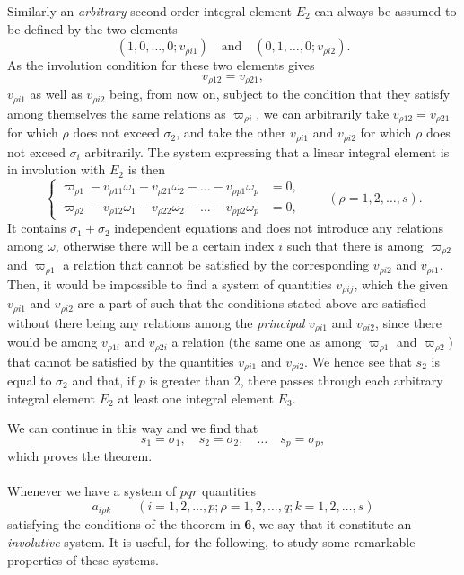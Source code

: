 \documentclass[leqno,11pt]{book}
\theoremstyle{shape1}
\theoremstyle{shapesmall}
\newcommand{\vp}{\varpi}
\begin{document}
Similarly an \emph{arbitrary} second order integral element $E_{2}$ can always be assumed to be defined by the two elements
\[
(1,0,\dots,0;v_{\rho i1})\quad\text{and}\quad(0,1,\dots,0;v_{\rho i2}).
\]
As the involution condition for these two elements gives
\[
v_{\rho 12}=v_{\rho 21},
\]
$v_{\rho i1}$ as well as $v_{\rho i2}$ being, from now on, subject to the condition that they satisfy among themselves the same relations as $\vp_{\rho i}$, we can arbitrarily take $v_{\rho 12}=v_{\rho 21}$ for which $\rho$ does not exceed $\sigma_{2}$, and take the other $v_{\rho i1}$ and $v_{\rho i2}$ for which $\rho$ does not exceed $\sigma_{i}$ arbitrarily. The system expressing that a linear integral element is in involution with $E_{2}$ is then
\begin{equation}
  \label{eq:p21}
  \left\{
    \begin{aligned}
      \vp_{\rho 1}-v_{\rho 11}\omega_{1}-v_{\rho 21}\omega_{2}-\dots-v_{\rho p1}\omega_{p}&=0,\\
      \vp_{\rho 2}-v_{\rho 12}\omega_{1}-v_{\rho 22}\omega_{2}-\dots-v_{\rho p2}\omega_{p}&=0,      
    \end{aligned}
  \right.
\qquad(\rho=1,2,\dots,s).
\end{equation}
It contains $\sigma_{1}+\sigma_{2}$ independent equations and does not introduce any relations among $\omega$, otherwise there will be a certain index $i$ such that there is among $\vp_{\rho 2}$ and $\vp_{\rho 1}$ a relation that cannot be satisfied by the corresponding $v_{\rho i2}$ and $v_{\rho i1}$. Then, it would be impossible to find a system of quantities $v_{\rho ij}$, which the given $v_{\rho i1}$ and $v_{\rho i2}$ are a part of such that the conditions stated above are satisfied without there being any relations among the \emph{principal} $v_{\rho i1}$ and $v_{\rho i2}$, since there would be among $v_{\rho 1i}$ and $v_{\rho 2i}$ a relation (the same one as among $\vp_{\rho 1}$ and $\vp_{\rho 2}$) that cannot be satisfied by the quantities $v_{\rho i1}$ and $v_{\rho i2}$. We hence see that $s_{2}$ is equal to $\sigma_{2}$ and that, if $p$ is greater than $2$, there passes through each arbitrary integral element $E_{2}$ at least one integral element $E_{3}$.

We can continue in this way and we find that
\[
s_{1}=\sigma_{1},\quad s_{2}=\sigma_{2},\quad\dots\quad s_{p}=\sigma_{p},
\]
which proves the theorem.

\paragraph{}
\label{sec:p7}
Whenever we have a system of $pqr$ quantities
\[
a_{i\rho k}\qquad(i=1,2,\dots,p;\rho=1,2,\dots,q;k=1,2,\dots, s)
\]
satisfying the conditions of the theorem in \textsection\textbf{6}, we say that it constitute an \emph{involutive} system. It is useful, for the following, to study some remarkable properties of these systems.
\end{document}
